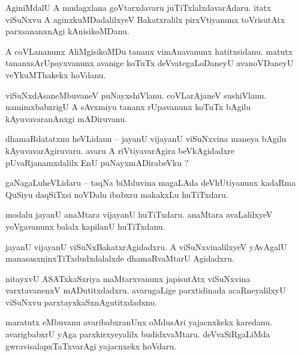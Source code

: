 \documentclass{article}
\begin{document}
\begin{mn}%
AginiMdalU A mudagxlana goVtarxdavaru juTiTxlalxdavarAdaru. itatx viSuNxvu A aginxkuMDadalilxyeV 
Bakatxralilx pirxVtiyanunx toVrisutAtx parxsananxnAgi kAnisikoMDanu.
\end{mn}

\begin{mn}%
A coVLananunx AliMgisikoMDu tananx vimAnavanunx hatitxsidanu. matutx tananxsArUpayxvanunx avanige 
koTuTx deVvategaLoDaneyU avanoVDaneyU veYkuMThakekx hoVdanu.
\end{mn}

\begin{mn}%
viSuNxdAsaneMbuvaneV puNayxshiVlanu. coVLarAjaneV sushiVlanu. namimxbabxrigU A sAvxmiyu tananx 
rUpavanunx koTuTx bAgilu kAyuvavaranAnxgi mADiruvanu.
\end{mn}


\begin{mn}%
dhamaRdatatxnu heVLidanu -- jayanU vijayanU viSuNxvina maneya bAgilu kAyuvavarAgiruvaru. avaru A 
riVtiyavarAgira beVkAgidadxre pUvaRjanamxdalilx EnU puNayxmADirabeVku ?
\end{mn}

\begin{mn}%
gaNagaLuheVLidaru -- taqNa biMduvina magaLAda deVhUtiyanunx kadaRma QuSiyu daqSiTxsi noVDalu 
ibabxru makakxLu huTiTxdaru.
\end{mn}

\begin{mn}%
modalu jayanU anaMtara vijayanU huTiTxdaru. anaMtara avaLalilxyeV yoVgavanunx balalx kapilanU 
huTiTxdanu.
\end{mn}

\begin{mn}%
jayanU vijayanU viSuNxBakatxrAgidadxru. A viSuNxvinalilxyeV yAvAgalU manasasxninxTiTxdudxdalalxde 
dhamaRvaMtarU Agidadxru.
\end{mn}

\begin{mn}%
nitayxvU ASATxkaSxriya maMtarxvanunx japisutAtx viSuNxvina varxtavanenxV mADutitxdadxru. 
avarugaLige parxtidinada acaRneyalilxyU viSuNxvu parxtayxkaSxnAgutitxdadxnu.
\end{mn}

\begin{mn}%
maratutx eMbuvanu avaribabxranUnx oMdusAri yajacnxkekx karedanu. avarigbabxrU yAga 
parxkirxyeyalilx budidxvaMtaru. deVvaSiRgaLiMda gwravisalapxTaTxvarAgi yajacnxekx hoVdaru.
\end{mn}
\end{document}
